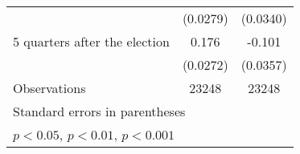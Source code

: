 \begin{table}[htbp]
\begin{tabular}{l*{2}{c}}
                    &    (0.0279)         &    (0.0340)         \\
[1em]
 5 quarters after the election&       0.176\sym{***}&      -0.101\sym{**} \\
                    &    (0.0272)         &    (0.0357)         \\
\hline
Observations        &       23248         &       23248         \\
\hline\hline
\multicolumn{3}{l}{\footnotesize Standard errors in parentheses}\\
\multicolumn{3}{l}{\footnotesize \sym{*} \(p<0.05\), \sym{**} \(p<0.01\), \sym{***} \(p<0.001\)}\\
\end{tabular}
\end{table}
